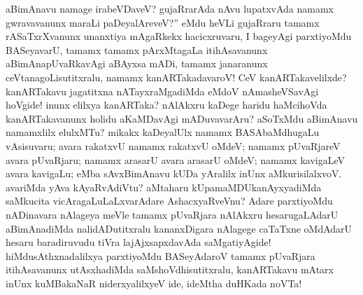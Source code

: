 \documentclass[11pt,a4size]{article}
\begin{document}
aBimAnavu namage irabeVDaveV? gujaRrarAda nAvu lupatxvAda namamx
gwravavanunx maraLi paDeyalAreveV?'' eMdu heVLi gujaRraru tamamx
rASaTxrXvanunx unanxtiya mAgaRkekx hacicxruvaru, I bageyAgi
parxtiyoMdu BASeyavarU, tamamx tamamx pArxMtagaLa itihAsavanunx
aBimAnapUvaRkavAgi aBAyxsa mADi, tamamx janaranunx
ceVtanagoLisutitxralu, namamx kanARTakadavaroV! CeV kanARTakavelilxde? 
kanARTakavu jagatitxna nATayxraMgadiMda eMdoV nAmasheVSavAgi
hoVgide! inunx elilxya kanARTaka? nAlAkxru kaDege haridu haMcihoVda
kanARTakavanunx holidu aKaMDavAgi mADuvavarAru?  aSoTxMdu aBimAnavu
namamxlilx elulxMTu? mikakx kaDeyalUlx namamx BASAbaMdhugaLu
vAsisuvaru; avara rakatxvU namamx rakatxvU oMdeV; namamx pUvaRjareV
avara pUvaRjaru; namamx arasarU avara arasarU oMdeV; namamx kavigaLeV
avara kavigaLu; eMba sAvxBimAnavu kUDa yAralilx inUnx
aMkurisilalxvoV. avariMda yAva kAyaRvAdiVtu? aMtaharu
kUpamaMDUkanAyxyadiMda saMkucita vicAragaLuLaLxvarAdare
AshacxyaRveVnu? 
Adare parxtiyoMdu nADinavara nAlageya meVle tamamx pUvaRjara
nAlAkxru hesarugaLAdarU aBimAnadiMda nalidADutitxralu kananxDigara
nAlagege caTaTxne oMdAdarU hesaru baradiruvudu tiVra lajAjxsapxdavAda
saMgatiyAgide! hiMdusAthxnadalilxya parxtiyoMdu BASeyAdaroV tamamx
pUvaRjara itihAsavanunx utAsxhadiMda saMshoVdhisutitxralu, kanARTakavu
mAtarx inUnx kuMBakaNaR niderxyalilxyeV ide, ideMtha duHKada noVTa!
\end{document}
